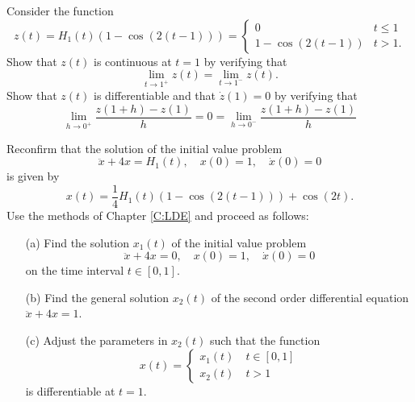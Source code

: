 \EXER

\TEXER

\begin{exercise}  \label{Ex:cont}
Consider the function
\[
z(t) = H_1(t)(1-\cos(2(t-1))) = \left\{
\begin{array}{cl} 0 & t \leq 1 \\ 1-\cos(2(t-1)) & t > 1. \end{array}\right.
\]
Show that $z(t)$ is continuous at $t=1$ by verifying that 
\[
\lim_{t\to 1^+}z(t) = \lim_{t\to 1^-}z(t).
\]
Show that $z(t)$ is differentiable and that $\dot{z}(1)=0$ by verifying that 
\[
\lim_{h\to 0^+} \frac{z(1+h)-z(1)}{h} = 0 = 
\lim_{h\to 0^-} \frac{z(1+h)-z(1)}{h}
\]
\end{exercise}

\begin{exercise} \label{c13.4.2}
Reconfirm that the solution of the initial value problem
\[
\ddot x + 4 x=H_1(t),\quad x(0)=1,\quad \dot x(0)=0
\]
is given by
\[
x(t)=\frac{1}{4}H_1(t)(1-\cos(2(t-1))) + \cos(2t).
\]
Use the methods of Chapter \ref{C:LDE} and proceed as follows:
\begin{itemize}
\item[(a)] Find the solution $x_1(t)$ of the initial value problem
\[
\ddot x + 4 x=0,\quad x(0)=1,\quad \dot x(0)=0
\]
on the time interval $t\in[0,1]$.
\item[(b)] Find the general solution $x_2(t)$ of the second order
differential equation $\ddot x + 4 x=1$.
\item[(c)] Adjust the parameters in $x_2(t)$ such that the function
\[
x(t)=\left\{ \begin{array}{l} x_1(t)\quad t\in[0,1]\\
x_2(t) \quad t>1 \end{array}\right.
\]
is differentiable at $t=1$.
\end{itemize}
\end{exercise}



\CEXER



